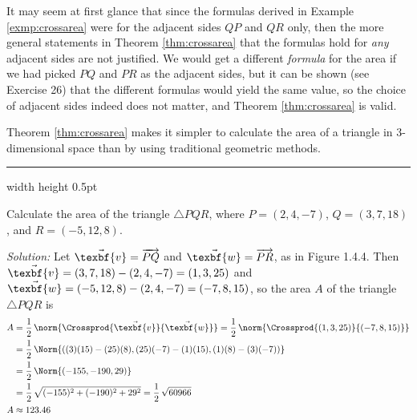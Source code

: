 It may seem at first glance that since the formulas derived in Example \ref{exmp:crossarea} were for the adjacent
sides $QP$ and $QR$ only, then the more general statements in Theorem \ref{thm:crossarea} that the formulas hold for
\emph{any} adjacent sides are not justified. We would get a different \emph{formula} for the area if we had
picked $PQ$ and $PR$ as the adjacent sides, but it can be shown (see Exercise 26) that the different formulas would
yield the same value, so the choice of adjacent sides indeed does not matter, and
Theorem \ref{thm:crossarea} is valid.

Theorem \ref{thm:crossarea} makes it simpler to calculate the area of a triangle in 3-dimensional space than by using
traditional geometric methods.

\vspace{4mm}
\hrule width \textwidth height 0.5pt
\begin{exmp}
 Calculate the area of the triangle $\triangle PQR$, where $P = (2,4,-7)$, $Q = (3,7,18)$, and
 $R =(-5,12,8)$.\vspace{1mm}
 \piccaption[]{}
 \par\noindent\emph{Solution:} Let $\vec{\texbf{v}} = \overrightarrow{PQ}$ and $\vec{\texbf{w}} = \overrightarrow{PR}$, as in
 Figure 1.4.4. Then $\vec{\texbf{v}} = (3,7,18) - (2,4,-7) = (1,3,25)$ and $\vec{\texbf{w}} = (-5,12,8) - (2,4,-7) = (-7,8,15)$,
 so the area $A$ of the triangle $\triangle PQR$ is
 \begin{align*}
 A &= \frac{1}{2}\,\norm{\Crossprod{\vec{\texbf{v}}}{\vec{\texbf{w}}}} = \frac{1}{2}\,\norm{\Crossprod{(1,3,25)}{(-7,8,15)}}\\
 &= \frac{1}{2}\,\Norm{((3)(15) - (25)(8), (25)(-7) - (1)(15), (1)(8) - (3)(-7))}\\
 &= \frac{1}{2}\,\Norm{(-155, -190, 29)}\\
 &= \frac{1}{2}\,\sqrt{(-155)^2 + (-190)^2 + 29^2} = \frac{1}{2}\,\sqrt{60966}\\
 A &\approx 123.46
 \end{align*}
 \end{exmp}
